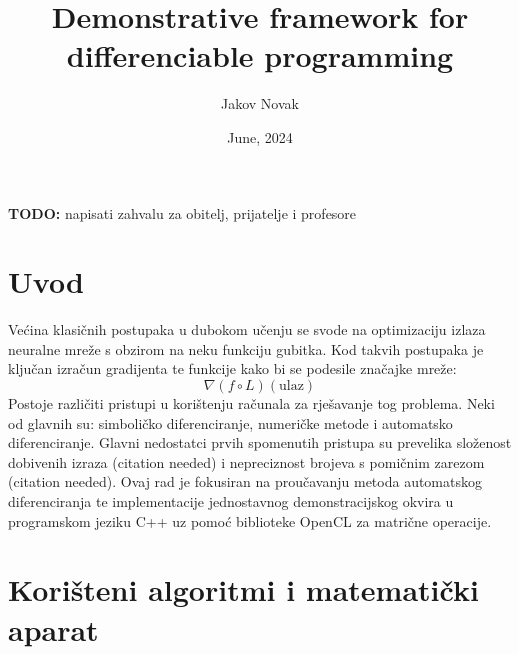 \documentclass[zavrsnirad]{fer}
\title{Demonstrative framework for differenciable programming}
\author{Jakov Novak}
\date{June, 2024}
\begin{document}
\maketitle






\begin{zahvale}
  \textbf{TODO:} napisati zahvalu za obitelj, prijatelje i profesore
\end{zahvale}


\mainmatter


\tableofcontents


\chapter{Uvod}
\label{pog:uvod}

Većina klasičnih postupaka u dubokom učenju se svode na optimizaciju izlaza neuralne mreže s obzirom na neku funkciju gubitka. Kod takvih postupaka je ključan izračun gradijenta te funkcije kako bi se podesile značajke mreže:
\begin{equation}
  \nabla (f \circ L) (\mathrm{ulaz})
\end{equation}
Postoje različiti pristupi u korištenju računala za rješavanje tog problema. Neki od glavnih su: simboličko diferenciranje, numeričke metode i automatsko diferenciranje. Glavni nedostatci prvih spomenutih pristupa su prevelika složenost dobivenih izraza (citation needed) i nepreciznost brojeva s pomičnim zarezom (citation needed). Ovaj rad je fokusiran na proučavanju metoda automatskog diferenciranja te implementacije jednostavnog demonstracijskog okvira u programskom jeziku C++ uz pomoć biblioteke OpenCL za matrične operacije.

\chapter{Korišteni algoritmi i matematički aparat}
\label{pog:teorijski_dio}
\end{document}
